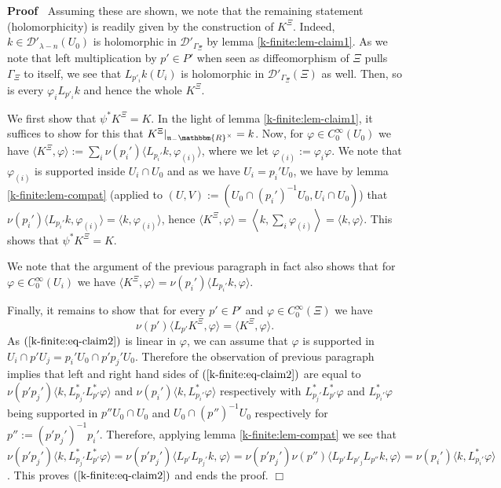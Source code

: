 \documentclass{article}
\newcommand{\assign}{:=}
\newenvironment{proof}{\noindent\textbf{Proof\ }}{\hspace*{\fill}$\Box$\medskip}
\numberwithin{definition}{section}
\numberwithin{lemma}{section}
\numberwithin{proposition}{section}
{\theorembodyfont{\rmfamily}\newtheorem{remark}{Remark}
\numberwithin{remark}{section}
}
\begin{document}
\begin{proof}
  Assuming these are shown, we note that the remaining statement
  (holomorphicity) is readily given by the construction of $K^{\Xi}$. Indeed,
  $k \in \mathcal{D}'_{\lambda - n} ( U_0)$ is holomorphic in
  $\mathcal{D}'_{\Gamma_{\Xi}}$ by lemma \ref{k-finite:lem-claim1}. As we note
  that left multiplication by $p' \in P'$ when seen as diffeomorphism of $\Xi$
  pulls $\Gamma_{\Xi}$ to itself, we see that $L_{p'_i} k ( U_i)$ is
  holomorphic in $\mathcal{D}'_{\Gamma_{\Xi}} ( \Xi)$ as well. Then, so is
  every $\varphi_i L_{p'_i} k$ and hence the whole $K^{\Xi}$.
  
  We first show that $\psi^{\ast} K^{\Xi} = K$. In the light of lemma
  \ref{k-finite:lem-claim1}, it suffices to show for this that $K^{\Xi}
  |_{\mathfrak{n}_- \mathbbm{R}^{\times}} = k$. Now, for $\varphi \in
  C_0^{\infty} ( U_0)$ we have $\langle K^{\Xi}, \varphi \rangle \assign
  \sum_i \nu ( p_i') \langle L_{p_i'} k, \varphi_{( i)} \rangle$, where we let
  $\varphi_{( i)} \assign \varphi_i \varphi$. We note that $\varphi_{( i)}$ is
  supported inside $U_i \cap U_0$ and as we have $U_i = p_i' U_0$, we have by
  lemma \ref{k-finite:lem-compat} (applied to $( U, V) \assign ( U_0 \cap (
  p_i')^{- 1} U_0, U_i \cap U_0)$) that $\nu ( p_i') \langle L_{p_i'} k,
  \varphi_{( i)} \rangle = \langle k, \varphi_{( i)} \rangle$, hence $\langle
  K^{\Xi}, \varphi \rangle = \left\langle k, \sum_i \varphi_{( i)}
  \right\rangle = \langle k, \varphi \rangle$. This shows that $\psi^{\ast}
  K^{\Xi} = K$.
  
  We note that the argument of the previous paragraph in fact also shows that
  for $\varphi \in C^{\infty}_0 ( U_i)$ we have $\langle K^{\Xi}, \varphi
  \rangle = \nu ( p_i') \langle L_{p_i'} k, \varphi \rangle$.
  
  Finally, it remains to show that for every $p' \in P'$ and $\varphi \in
  C^{\infty}_0 ( \Xi)$ we have
  \begin{equation}
    \nu ( p') \langle L_{p'} K^{\Xi}, \varphi \rangle = \langle K^{\Xi},
    \varphi \rangle . \label{k-finite:eq-claim2}
  \end{equation}
  As $( \ref{k-finite:eq-claim2})$ is linear in $\varphi$, we can assume that
  $\varphi$ is supported in $U_i \cap p' U_j = p_i' U_0 \cap p' p_j' U_0$.
  Therefore the observation of previous paragraph implies that left and right
  hand sides of $( \ref{k-finite:eq-claim2})$ are equal to $\nu ( p' p_j')
  \langle k, L_{p_j'}^{\ast} L_{p'}^{\ast} \varphi \rangle$ and $\nu ( p_i')
  \langle k, L_{p_i'}^{\ast} \varphi \rangle$ respectively with
  $L_{p_j'}^{\ast} L_{p'}^{\ast} \varphi$ and $L_{p_i'}^{\ast} \varphi$ being
  supported in $p'' U_0 \cap U_0$ and $U_0 \cap ( p_{}'')^{- 1} U_0$
  respectively for $p'' \assign ( p' p_j')^{- 1} p_i'$. Therefore, applying
  lemma \ref{k-finite:lem-compat} we see that $\nu ( p' p_j') \langle k,
  L_{p_j'}^{\ast} L_{p'}^{\ast} \varphi \rangle = \nu ( p' p_j') \langle
  L_{p'} L_{p_j'} k,^{} \varphi \rangle = \nu ( p' p_j') \nu ( p'') \langle
  L_{p'} L_{p'_j} L_{p''} k, \varphi \rangle = \nu ( p_i') \langle k,
  L_{p_i'}^{\ast} \varphi \rangle$. This proves $( \ref{k-finite:eq-claim2})$
  and ends the proof.
\end{proof}
\end{document}
